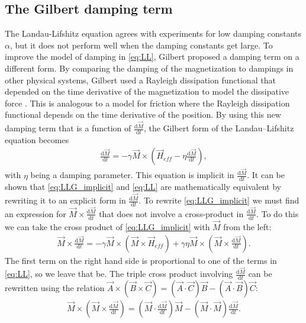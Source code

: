 \documentclass[12pt, a4paper]{article}		%
\numberwithin{equation}{section}
\begin{document}
\subsection{The Gilbert damping term}
The Landau-Lifshitz equation agrees with experiments for low damping constants $\alpha$, but it does not perform well when the damping constants get large. To improve the model of damping in \eqref{eq:LL}, Gilbert proposed a damping term on a different form. By comparing the damping of the magnetization to dampings in other physical systems, Gilbert used a Rayleigh dissipation functional that depended on the time derivative of the magnetization to model the dissipative force \cite{Gilbert2004Classics}. This is analogous to a model for friction where the Rayleigh dissipation functional depends on the time derivative of the position. By using this new damping term that is a function of $\frac{\textrm{d} \vec{M}}{\textrm{d} t}$, the Gilbert form of the Landau--Lifshitz equation becomes
\begin{align}
\label{eq:LLG_implicit}
\frac{\textrm{d} \vec{M}}{\textrm{d} t} = -\gamma \vec{M} \times (\vec{H}_{eff} - \eta \frac{\textrm{d} \vec{M}}{\textrm{d} t}),
\end{align}
with $\eta$ being a damping parameter. This equation is implicit in $\frac{\textrm{d} \vec{M}}{\textrm{d} t}$. It can be shown that \eqref{eq:LLG_implicit} and \eqref{eq:LL} are mathematically equivalent by rewriting it to an explicit form in $\frac{\textrm{d} \vec{M}}{\textrm{d} t}$. To rewrite \eqref{eq:LLG_implicit} we must find an expression for $\vec{M}\times\frac{\textrm{d} \vec{M}}{\textrm{d} t}$ that does not involve a cross-product in $\frac{\textrm{d} \vec{M}}{\textrm{d} t}$. To do this we can take the cross product of \eqref{eq:LLG_implicit} with $\vec{M}$ from the left:
\begin{align}
\label{eq:mtimesdmdt}
\vec{M}\times\frac{\textrm{d} \vec{M}}{\textrm{d} t} = -\gamma \vec{M}\times(\vec{M}\times\vec{H}_{eff}) + \gamma\eta \vec{M}\times(\vec{M}\times\frac{\textrm{d} \vec{M}}{\textrm{d} t}).
\end{align}
The first term on the right hand side is proportional to one of the terms in \eqref{eq:LL}, so we leave that be. The triple cross product involving $\frac{\textrm{d} \vec{M}}{\textrm{d} t}$ can be rewritten using the relation $\vec{A}\times(\vec{B}\times\vec{C}) = (\vec{A}\cdot\vec{C})\vec{B} - (\vec{A}\cdot\vec{B})\vec{C}$:
\begin{align}
\label{eq:mag_triple_crossproduct}
\vec{M}\times(\vec{M}\times\frac{\textrm{d} \vec{M}}{\textrm{d} t}) =  (\vec{M}\cdot\frac{\textrm{d} \vec{M}}{\textrm{d} t})\vec{M} - (\vec{M}\cdot\vec{M})\frac{\textrm{d} \vec{M}}{\textrm{d} t}.
\end{align}
\end{document}
